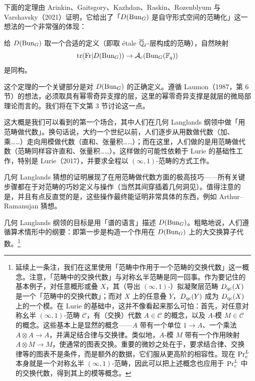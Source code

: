 下面的定理由 Arinkin、Gaitsgory、Kazhdan、Raskin、Rozenblyum 与 Varshavsky（2021）证明，它给出了「$D(\operatorname{Bun}_G)$ 是自守形式空间的范畴化」这一想法的一个非常强的体现：

\begin{theorem}
给 $D(\operatorname{Bun}_G)$ 取一个合适的定义（即取 étale $\overline{\mathbb{Q}}_{\ell}$-层构成的范畴），自然映射
\[
\operatorname{tr}(\mathrm{Fr}|D(\operatorname{Bun}_G)) \to \mathcal{A}_c(\operatorname{Bun}_G(\mathbb{F}_q))
\]
是同构。
\end{theorem}

这个定理的一个关键部分是对 $D(\operatorname{Bun}_G)$ 的正确定义。遵循 Laumon（1987，第 6 节）的想法，必须取具有幂零奇异支撑的层，这里的幂零奇异支撑是就层的微局部理论而言的。我们将在下文第 3 节讨论这一点。

\begin{remark}
这大概是我们可以看到的第一个场合，其中人们在几何 Langlands 纲领中做「用范畴做代数」。换句话说，大约一个世纪以前，人们逐步从用数做代数（加、乘……）走向用模做代数（直和、张量积……）；而在这里，人们做的是用范畴做代数（范畴同样容许直和、张量积……）。这样做的可能性依赖于 Lurie 的基础性工作，特别是 Lurie（2017），并要求全程以 $(\infty,1)$-范畴的方式工作。

几何 Langlands 猜想的证明展现了在用范畴做代数方面的极高技巧——所有关键步骤都在于对范畴的巧妙定义与操作（当然其间穿插着几何洞见）。值得注意的是，并且有点反直觉的是，这些操作最终能证明非常具体的东西，例如 Arthur–Ramanujan 猜想。
\end{remark}

几何 Langlands 纲领的目标是用「谱的语言」描述 $D(\operatorname{Bun}_G)$。粗略地说，人们遵循算术情形中的纲要：即第一步是构造一个作用在 $D(\operatorname{Bun}_G)$ 上的大交换算子代数。\footnote{延续上一条注，我们在这里使用「范畴中作用于一个范畴的交换代数」这一概念。注意，「范畴中的交换代数」与对称幺半范畴是同一回事。作为要记住的基本例子，对任意概形或叠 $X$，其（导出 $(\infty,1)$-）拟凝聚层范畴 $D_{\mathrm{qc}}(X)$ 是一个「范畴中的交换代数」；而对 $X$ 上的任意叠 $Y$，$D_{\mathrm{qc}}(Y)$ 成为 $D_{\mathrm{qc}}(X)$ 上的一个模。在 Lurie 的基础中，这并不像看起来那么可怕：首先，对任意对称幺半 $(\infty,1)$-范畴 $\mathcal{C}$，有（交换）代数 $A \in \mathcal{C}$ 的概念，以及 $A$-模 $M \in \mathcal{C}$ 的概念。这些基本上是显然的概念——$A$ 带有一个单位 $1 \to A$、一个乘法 $A \otimes A \to A$，并满足结合律与交换律。类似地，$A$-模 $M$ 带有一个作用映射 $A \otimes M \to M$，使通常的图表交换。重要的微妙之处在于，要求结合律、交换律等的图表不是条件，而是额外的数据，它们服从更高阶的相容性。现在 $\mathrm{Pr}^{L}_e$ 本身就是一个对称幺半 $(\infty,1)$-范畴，因此可以把上述概念也应用于 $\mathrm{Pr}^{L}_e$ 中的交换代数，得到其上的模等概念。}

